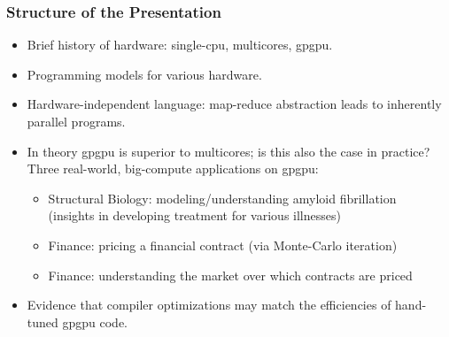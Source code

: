 \documentclass{beamer}
\begin{document}
\begin{frame}
  \frametitle{Structure of the Presentation}
  \centering
 \begin{itemize} 
    \item Brief history of hardware: single-{\sc cpu}, multicores, {\sc gpgpu}. \smallskip

    \item Programming models for various hardware. \smallskip

    \item Hardware-independent language: map-reduce abstraction leads to inherently parallel programs. \smallskip

    \item In theory {\sc gpgpu} is superior to multicores; is this also the case in practice?
            Three real-world, big-compute applications on {\sc gpgpu}: \smallskip
    \begin{itemize}
        \item Structural Biology: modeling/understanding amyloid fibrillation \\ (insights in developing treatment for various illnesses) \smallskip
        \item Finance: pricing a financial contract (via Monte-Carlo iteration)  \smallskip %
        \item Finance: understanding the market over which contracts are priced
    \end{itemize} \smallskip

    \item Evidence that compiler optimizations may match the efficiencies of hand-tuned {\sc gpgpu} code.
\end{itemize} 
\end{frame}
\end{document}
